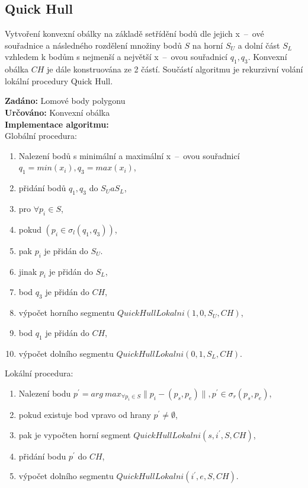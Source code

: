 \documentclass[a4paper, 12pt, oneside, titlepage]{article} %
\begin{document}
\subsection{Quick Hull} \label{qh}
Vytvoření konvexní obálky na základě setřídění bodů dle jejich x~--~ové souřadnice a následného rozdělení množiny bodů $S$ na horní $S_U$ a dolní část $S_L$ vzhledem k bodům s nejmenší a největší x~--~ovou souřadnicí $q_1, q_3$. Konvexní obálka $CH$ je dále konstruována ze 2 částí. Součástí algoritmu je rekurzivní volání lokální procedury Quick Hull.

\noindent\textbf{Zadáno:} Lomové body polygonu\\ 
\noindent\textbf{Určováno:} Konvexní obálka\\
\noindent\textbf{Implementace algoritmu:}\\
Globální procedura:
\begin{enumerate}
\item Nalezení bodů s minimální a maximální x~--~ovou souřadnicí $q_1=min(x_i), q_3=max(x_i)$,
\item přidání bodů $q_1, q_3$ do $S_U a S_L$,
\item pro $\forall p_i \in S$,
\item \quad pokud $(p_i\in \sigma_l(q_1,q_3))$,
\item \quad pak $p_i$ je přidán do $S_U$.
\item \quad jinak $p_i$ je přidán do $S_L$,
\item bod $q_3$ je přidán do $CH$,
\item výpočet horního segmentu $QuickHullLokalni(1,0,S_U,CH)$,
\item bod $q_1$ je přidán do $CH$,
\item výpočet dolního segmentu $QuickHullLokalni(0,1,S_L,CH)$.
\end{enumerate}

Lokální procedura:
\begin{enumerate}
\item Nalezení bodu $p^{'}=arg~max_{\forall p_i \in S}\|p_i-(p_s,p_e)\|, p^{'}\in \sigma_r(p_s,p_e)$,
\item pokud existuje bod vpravo od hrany $p^{'}\neq \emptyset$,
\item \quad pak je vypočten horní segment $QuickHullLokalni(s,i^{'},S,CH)$,
\item \quad přidání bodu $p^{'}$ do $CH$,
\item \quad výpočet dolního segmentu $QuickHullLokalni(i^{'},e,S,CH)$.
\end{enumerate}
\end{document}
